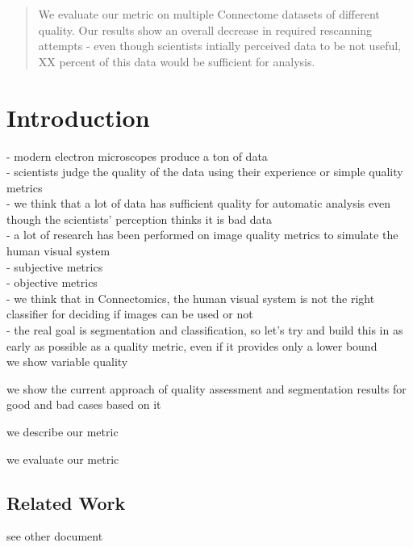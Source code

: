 \documentclass{llncs}
\begin{document}
\begin{abstract}
We evaluate our metric on multiple Connectome datasets of different quality. Our results show an overall decrease in required rescanning attempts - even though scientists intially perceived data to be not useful, XX percent of this data would be sufficient for analysis.


\end{abstract}

%
\section{Introduction}
- modern electron microscopes produce a ton of data\\
- scientists judge the quality of the data using their experience or simple quality metrics\\
- we think that a lot of data has sufficient quality for automatic analysis even though the scientists' perception thinks it is bad data\\
- a lot of research has been performed on image quality metrics to simulate the human visual system\\
- subjective metrics\\
- objective metrics\\
- we think that in Connectomics, the human visual system is not the right classifier for deciding if images can be used or not\\
- the real goal is segmentation and classification, so let's try and build this in as early as possible as a quality metric, even if it provides only a lower bound\\

we show variable quality

we show the current approach of quality assessment and segmentation results for good and bad cases based on it

we describe our metric

we evaluate our metric





%
%
\subsection{Related Work}
%
%
%
%
see other document
\end{document}

